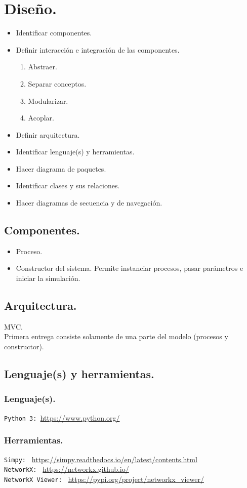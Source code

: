 \documentclass[a4paper,12pt]{article}
\begin{document}
\section{Diseño.}
\begin{itemize}
  \item{Identificar componentes.}
  \item{Definir interacción e integración de las componentes.
    \begin{enumerate}
      \item{Abstraer.}
      \item{Separar conceptos.}
      \item{Modularizar.}
      \item{Acoplar.}
    \end{enumerate}
  }
  \item{Definir arquitectura.}
  \item{Identificar lenguaje(s) y herramientas.}
  \item{Hacer diagrama de paquetes.}
  \item{Identificar clases y sus relaciones.}
  \item{Hacer diagramas de secuencia y de navegación.}
\end{itemize}
\subsection{Componentes.}{
\begin{itemize}
  \item{Proceso.}
  \item{Constructor del sistema. Permite instanciar procesos, pasar parámetros e
    iniciar la simulación.
  }
\end{itemize}
}
\subsection{Arquitectura.}{
  MVC.\\
  Primera entrega consiste solamente de una parte del modelo (procesos y
  constructor).
}
\subsection{Lenguaje(s) y herramientas.}{
\subsubsection{Lenguaje(s).}{
  \texttt{Python 3: }\url{https://www.python.org/}\\
}
\subsubsection{Herramientas.}{
  \texttt{Simpy: } \url{https://simpy.readthedocs.io/en/latest/contents.html}
    \cite{Simpy}\\
  \texttt{NetworkX: } \url{https://networkx.github.io/}\\
  \texttt{NetworkX Viewer: } \url{https://pypi.org/project/networkx_viewer/}\\
}
}
\end{document}
